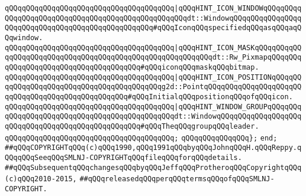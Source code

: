 \verb|qQQqqQQqqQQqqQQqqQQqqQQqqQQqqQQqqQQqqQQq|\verb#|qQQqHINT_ICON_WINDOWqQQqqQQqqQQqqQQqqQQqqQQqqQQqqQQqqQQqqQQqqQQqqQQqqQQqdt::WindowqQQqqQQqqQQqqQQqqQQqqQQqqQQqqQQqqQQqqQQqqQQqqQQqqQQq#\verb|#qQQqIconqQQqspecifiedqQQqasqQQqaqQQqwindow.|\newline
\verb|qQQqqQQqqQQqqQQqqQQqqQQqqQQqqQQqqQQqqQQq|\verb#|qQQqHINT_ICON_MASKqQQqqQQqqQQqqQQqqQQqqQQqqQQqqQQqqQQqqQQqqQQqqQQqqQQqqQQqqQQqdt::Rw_PixmapqQQqqQQqqQQqqQQqqQQqqQQqqQQqqQQqqQQqqQQq#\verb|#qQQqiconqQQqmaskqQQqbitmap.|\newline
\verb|qQQqqQQqqQQqqQQqqQQqqQQqqQQqqQQqqQQqqQQq|\verb#|qQQqHINT_ICON_POSITIONqQQqqQQqqQQqqQQqqQQqqQQqqQQqqQQqqQQqqQQqqQQqg2d::PointqQQqqQQqqQQqqQQqqQQqqQQqqQQqqQQqqQQqqQQqqQQqqQQqqQQq#\verb|#qQQqInitialqQQqpositionqQQqofqQQqicon.|\newline
\verb|qQQqqQQqqQQqqQQqqQQqqQQqqQQqqQQqqQQqqQQq|\verb#|qQQqHINT_WINDOW_GROUPqQQqqQQqqQQqqQQqqQQqqQQqqQQqqQQqqQQqqQQqqQQqqQQqdt::WindowqQQqqQQqqQQqqQQqqQQqqQQqqQQqqQQqqQQqqQQqqQQqqQQqqQQq#\verb|#qQQqTheqQQqgroupqQQqleader.|\newline
\verb|qQQqqQQqqQQqqQQqqQQqqQQqqQQqqQQqqQQqqQQq;|\newline
\newline
\verb|qQQqqQQqqQQqqQQq};|\newline
\newline
\verb|end;|\newline
\newline
\newline
\verb|##qQQqCOPYRIGHTqQQq(c)qQQq1990,qQQq1991qQQqbyqQQqJohnqQQqH.qQQqReppy.qQQqqQQqSeeqQQqSMLNJ-COPYRIGHTqQQqfileqQQqforqQQqdetails.|\newline
\verb|##qQQqSubsequentqQQqchangesqQQqbyqQQqJeffqQQqProtheroqQQqCopyrightqQQq(c)qQQq2010-2015,|\newline
\verb|##qQQqreleasedqQQqperqQQqtermsqQQqofqQQqSMLNJ-COPYRIGHT.|\newline

